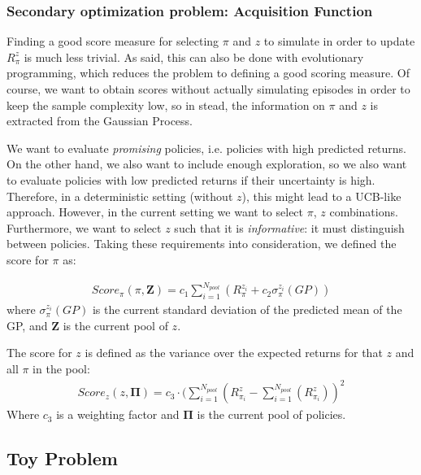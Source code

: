 \subsubsection{Secondary optimization problem: Acquisition Function}

Finding a good score measure for selecting $\pi$ and $z$ to simulate in order to update $R_{\pi}^z$ is much less trivial. As said, this can also be done with evolutionary programming, which reduces the problem to defining a good scoring measure. Of course, we want to obtain scores without actually simulating episodes in order to keep the sample complexity low, so in stead,  the information on $\pi$ and $z$ is extracted from the Gaussian Process. 

We want to evaluate \textit{promising} policies, i.e. policies with high predicted returns. On the other hand, we also want to include enough exploration, so we also want to evaluate policies with low predicted returns if their uncertainty is high. Therefore, in a deterministic setting (without $z$), this might lead to a UCB-like approach. %
However, in the current setting we want to select $\pi$, $z$ combinations. Furthermore, we want to select $z$ such that it is \textit{informative}: it must distinguish between policies. Taking these requirements into consideration, we defined the score for $\pi$ as: 

\begin{align}
Score_{\pi}(\pi ,\mathbf{Z}) = c_1 \sum_{i=1}^{N_{pool}} (R_{\pi}^{z_i} + c_2 \sigma_{\pi}^{z_i}(GP)) 
\end{align}
where $\sigma_{\pi}^{z_i}(GP)$ is the current standard deviation of the predicted mean of the GP, and $\mathbf{Z}$ is the current pool of $z$. 

The score for $z$ is defined as the variance over the expected returns for that $z$ and all $\pi$ in the pool:
\begin{align}
Score_z(z, \mathbf{\Pi}) = c_3 \cdot (\sum_{i=1}^{N_{pool}}(R_{\pi_i}^z-\sum_{i=1}^{N_{pool}}(R_{\pi_i}^z) )^2
\end{align}
Where $c_3$ is a weighting factor and $\mathbf{\Pi}$ is the current pool of policies.

\subsection{Toy Problem}\label{toyprob}

